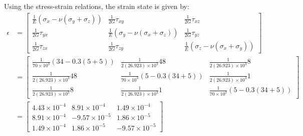 Using the stress-strain relations, the strain state is given by:
\[
\begin{aligned}
    \epsilon &=
    \begin{bmatrix}
        \frac{1}{E} (\sigma_x - \nu(\sigma_y + \sigma_z)) & \frac{1}{2G} \tau_{xy} & \frac{1}{2G} \tau_{xz} \\
        \frac{1}{2G} \tau_{yx} & \frac{1}{E} (\sigma_y - \nu(\sigma_x + \sigma_z)) & \frac{1}{2G} \tau_{yz} \\
        \frac{1}{2G} \tau_{zx} & \frac{1}{2G} \tau_{zy} & \frac{1}{E} (\sigma_z - \nu(\sigma_x + \sigma_y))
    \end{bmatrix} \\
    &=
    \begin{bmatrix}
        \frac{1}{70\times 10^3} (34 - 0.3(5 + 5)) & \frac{1}{2(26.923)\times 10^3} 48 & \frac{1}{2(26.923)\times 10^3} 8 \\
        \frac{1}{2(26.923)\times 10^3} 48 & \frac{1}{70\times 10^3} (5 - 0.3(34 + 5)) & \frac{1}{2(26.923)\times 10^3} 1 \\
        \frac{1}{2(26.923)\times 10^3} 8 & \frac{1}{2(26.923)\times 10^3} 1 & \frac{1}{70\times 10^3} (5 - 0.3(34 + 5))
    \end{bmatrix} \\
    &=
    \begin{bmatrix}
        4.43 \times 10^{-4} & 8.91 \times 10^{-4} & 1.49 \times 10^{-4} \\
        8.91 \times 10^{-4} & -9.57 \times 10^{-5} & 1.86 \times 10^{-5} \\
        1.49 \times 10^{-4} & 1.86 \times 10^{-5} & -9.57 \times 10^{-5}
    \end{bmatrix}
\end{aligned}
\]